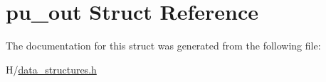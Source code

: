 \hypertarget{structpu__out}{
\section{pu\_\-out Struct Reference}
\label{structpu__out}
}


The documentation for this struct was generated from the following file:\begin{DoxyCompactItemize}
\item 
H/\hyperlink{data__structures_8h}{data\_\-structures.h}\end{DoxyCompactItemize}
